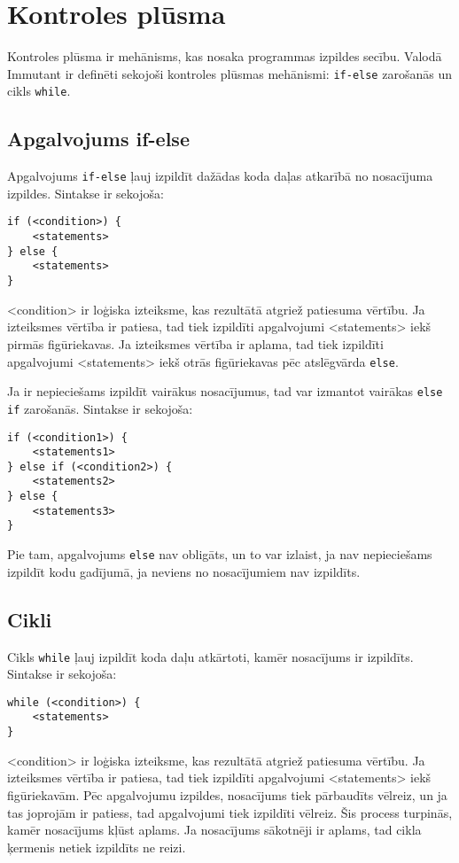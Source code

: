 \documentclass[12pt,a4paper]{report}
\begin{document}
\section{Kontroles plūsma}
Kontroles plūsma ir mehānisms, kas nosaka programmas izpildes secību. Valodā Immutant ir definēti sekojoši kontroles plūsmas mehānismi: \texttt{if-else} zarošanās un cikls \texttt{while}.

\subsection{Apgalvojums if-else}

Apgalvojums \texttt{if-else} ļauj izpildīt dažādas koda daļas atkarībā no nosacījuma izpildes. Sintakse ir sekojoša:
\begin{verbatim}
if (<condition>) {
    <statements>
} else {
    <statements>
}
\end{verbatim}

<condition> ir loģiska izteiksme, kas rezultātā atgriež patiesuma vērtību. Ja izteiksmes vērtība ir patiesa, tad tiek izpildīti apgalvojumi <statements> iekš pirmās figūriekavas. Ja izteiksmes vērtība ir aplama, tad tiek izpildīti apgalvojumi <statements> iekš otrās figūriekavas pēc atslēgvārda \texttt{else}.

Ja ir nepieciešams izpildīt vairākus nosacījumus, tad var izmantot vairākas \texttt{else if} zarošanās. Sintakse ir sekojoša:
\begin{verbatim}
if (<condition1>) {
    <statements1>
} else if (<condition2>) {
    <statements2>
} else {
    <statements3>
}
\end{verbatim}

Pie tam, apgalvojums \texttt{else} nav obligāts, un to var izlaist, ja nav nepieciešams izpildīt kodu gadījumā, ja neviens no nosacījumiem nav izpildīts.

\subsection{Cikli}
Cikls \texttt{while} ļauj izpildīt koda daļu atkārtoti, kamēr nosacījums ir izpildīts. Sintakse ir sekojoša:
\begin{verbatim}
while (<condition>) {
    <statements>
}
\end{verbatim}

<condition> ir loģiska izteiksme, kas rezultātā atgriež patiesuma vērtību. Ja izteiksmes vērtība ir patiesa, tad tiek izpildīti apgalvojumi <statements> iekš figūriekavām. Pēc apgalvojumu izpildes, nosacījums tiek pārbaudīts vēlreiz, un ja tas joprojām ir patiess, tad apgalvojumi tiek izpildīti vēlreiz. Šis process turpinās, kamēr nosacījums kļūst aplams. Ja nosacījums sākotnēji ir aplams, tad cikla ķermenis netiek izpildīts ne reizi.
\end{document}
